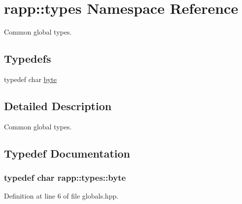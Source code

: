 \hypertarget{namespacerapp_1_1types}{\section{rapp\-:\-:types Namespace Reference}
\label{namespacerapp_1_1types}
}


Common global types.  


\subsection*{Typedefs}
\begin{DoxyCompactItemize}
\item 
typedef char \hyperlink{namespacerapp_1_1types_a1dbc9dc2ab4507d8fb58ac3a204d307b}{byte}
\end{DoxyCompactItemize}


\subsection{Detailed Description}
Common global types. 

\subsection{Typedef Documentation}
\hypertarget{namespacerapp_1_1types_a1dbc9dc2ab4507d8fb58ac3a204d307b}{
\subsubsection[{byte}]{\setlength{\rightskip}{0pt plus 5cm}typedef char {\bf rapp\-::types\-::byte}}}\label{namespacerapp_1_1types_a1dbc9dc2ab4507d8fb58ac3a204d307b}


Definition at line 6 of file globals.\-hpp.

